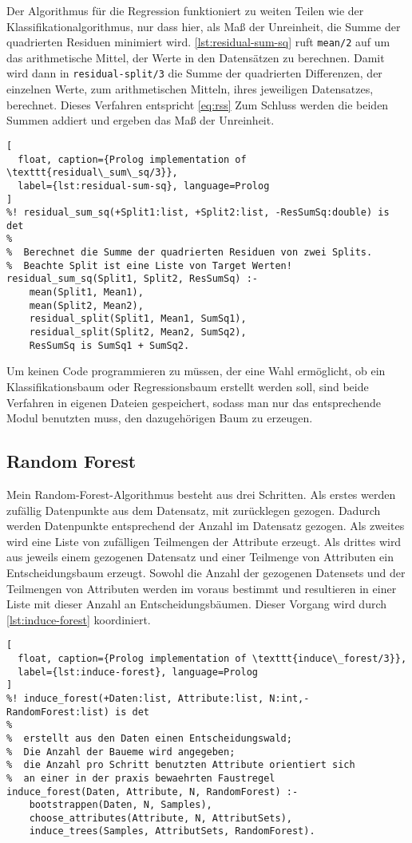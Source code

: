 Der Algorithmus für die Regression funktioniert zu weiten Teilen wie der Klassifikationalgorithmus,
nur dass hier, als Maß der Unreinheit, die Summe der quadrierten Residuen minimiert wird.
\cref{lst:residual-sum-sq} ruft \texttt{mean/2} auf um das arithmetische Mittel,
der Werte in den Datensätzen zu berechnen. Damit wird dann in \texttt{residual-split/3}
die Summe der quadrierten Differenzen, der einzelnen Werte, zum arithmetischen Mitteln, ihres
jeweiligen Datensatzes, berechnet. Dieses Verfahren entspricht \cref{eq:rss}
Zum Schluss werden die beiden Summen addiert und ergeben das Maß der Unreinheit.

\begin{lstlisting}[
  float, caption={Prolog implementation of \texttt{residual\_sum\_sq/3}},
  label={lst:residual-sum-sq}, language=Prolog
]
%! residual_sum_sq(+Split1:list, +Split2:list, -ResSumSq:double) is det
%
%  Berechnet die Summe der quadrierten Residuen von zwei Splits.
%  Beachte Split ist eine Liste von Target Werten!
residual_sum_sq(Split1, Split2, ResSumSq) :-
    mean(Split1, Mean1),
    mean(Split2, Mean2),
    residual_split(Split1, Mean1, SumSq1),
    residual_split(Split2, Mean2, SumSq2),
    ResSumSq is SumSq1 + SumSq2.
\end{lstlisting}

Um keinen Code programmieren zu müssen, der eine Wahl ermöglicht, ob ein Klassifikationsbaum
oder Regressionsbaum erstellt werden soll, sind beide Verfahren in eigenen Dateien gespeichert,
sodass man nur das entsprechende Modul benutzten muss, den dazugehörigen Baum zu erzeugen.

\subsection{Random Forest}

Mein Random-Forest-Algorithmus besteht aus drei Schritten. Als erstes werden zufällig Datenpunkte aus dem Datensatz,
mit zurücklegen gezogen. Dadurch werden Datenpunkte entsprechend der Anzahl im Datensatz gezogen.
Als zweites wird eine Liste von zufälligen Teilmengen der Attribute erzeugt. Als drittes wird aus jeweils
einem gezogenen Datensatz und einer Teilmenge von Attributen ein Entscheidungsbaum erzeugt.
Sowohl die Anzahl der gezogenen Datensets und der Teilmengen von Attributen werden im voraus bestimmt
und resultieren in einer Liste mit dieser Anzahl an Entscheidungsbäumen.
Dieser Vorgang wird durch \cref{lst:induce-forest} koordiniert.

\begin{lstlisting}[
  float, caption={Prolog implementation of \texttt{induce\_forest/3}},
  label={lst:induce-forest}, language=Prolog
]
%! induce_forest(+Daten:list, Attribute:list, N:int,-RandomForest:list) is det
%
%  erstellt aus den Daten einen Entscheidungswald;
%  Die Anzahl der Baueme wird angegeben;
%  die Anzahl pro Schritt benutzten Attribute orientiert sich 
%  an einer in der praxis bewaehrten Faustregel
induce_forest(Daten, Attribute, N, RandomForest) :-
    bootstrappen(Daten, N, Samples),
    choose_attributes(Attribute, N, AttributSets),
    induce_trees(Samples, AttributSets, RandomForest).
\end{lstlisting}

